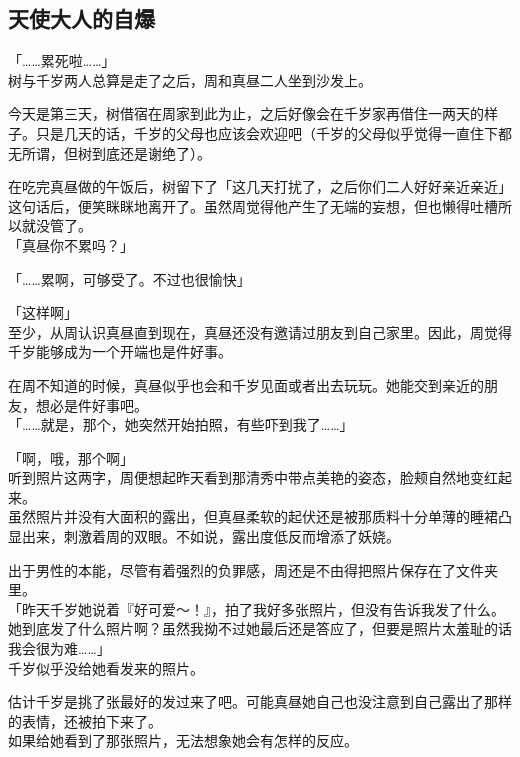 \subsection{天使大人的自爆}

「……累死啦……」\\

树与千岁两人总算是走了之后，周和真昼二人坐到沙发上。

今天是第三天，树借宿在周家到此为止，之后好像会在千岁家再借住一两天的样子。只是几天的话，千岁的父母也应该会欢迎吧（千岁的父母似乎觉得一直住下都无所谓，但树到底还是谢绝了）。

在吃完真昼做的午饭后，树留下了「这几天打扰了，之后你们二人好好亲近亲近」这句话后，便笑眯眯地离开了。虽然周觉得他产生了无端的妄想，但也懒得吐槽所以就没管了。\\

「真昼你不累吗？」

「……累啊，可够受了。不过也很愉快」

「这样啊」\\

至少，从周认识真昼直到现在，真昼还没有邀请过朋友到自己家里。因此，周觉得千岁能够成为一个开端也是件好事。

在周不知道的时候，真昼似乎也会和千岁见面或者出去玩玩。她能交到亲近的朋友，想必是件好事吧。\\

「……就是，那个，她突然开始拍照，有些吓到我了……」

「啊，哦，那个啊」\\

听到照片这两字，周便想起昨天看到那清秀中带点美艳的姿态，脸颊自然地变红起来。\\

虽然照片并没有大面积的露出，但真昼柔软的起伏还是被那质料十分单薄的睡裙凸显出来，刺激着周的双眼。不如说，露出度低反而增添了妖娆。

出于男性的本能，尽管有着强烈的负罪感，周还是不由得把照片保存在了文件夹里。\\

「昨天千岁她说着『好可爱～！』，拍了我好多张照片，但没有告诉我发了什么。她到底发了什么照片啊？虽然我拗不过她最后还是答应了，但要是照片太羞耻的话我会很为难……」\\

千岁似乎没给她看发来的照片。

估计千岁是挑了张最好的发过来了吧。可能真昼她自己也没注意到自己露出了那样的表情，还被拍下来了。\\

如果给她看到了那张照片，无法想象她会有怎样的反应。

